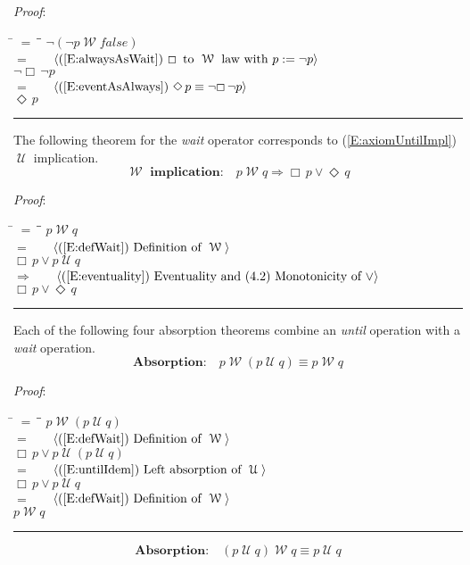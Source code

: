 \documentclass[12pt, fleqn, leqno]{article}
\newcommand{\lgap}{2pt}                             %
\newcommand{\mymathindent}{24pt}                    %
\newcommand{\impl}{\ensuremath{\Rightarrow}}        %
\newcommand{\Until}{\;\mathcal{U}\;}
\newcommand{\Wait}{\;\mathcal{W}\;}
\newcommand{\Event}{\Diamond\,}
\newcommand{\Always}{\Box\,}
\newcommand{\myqed}{\rule[-.23ex]{1.2ex}{2.0ex}}
\newcommand{\myqedtab}{\hspace{384pt}}              %
\newcommand{\Gll} {\langle}                         %
\newcommand{\Ggg} {\rangle}                         %
\newcommand{\Hint}[1]     {\ \ \ $\Gll              \mbox{#1} \Ggg$ }   %
\begin{document}
\emph{Proof}:
\begin{tabbing}
\hspace{\mymathindent} \= $= \;$ \= \myqedtab \= \kill
\> \> $\neg(\neg p \Wait false)$\\[\lgap]
\> $=$ \> \Hint{(\ref{E:alwaysAsWait}) $\Always$ to $\Wait$ law with $p := \neg p$} \\[\lgap]
\> \> $\neg\Always\neg p$\\[\lgap]
\> $=$  \>  \Hint{(\ref{E:eventAsAlways}) $\Event p \equiv \neg\Always\neg p$}\\[\lgap]
\> \> $\Event p$ \quad \myqed
\end{tabbing}

The following theorem for the \textit{wait} operator corresponds to (\ref{E:axiomUntilImpl}) $\Until$ implication.
\begin{equation}\label{E:waitEntailment}
\textbf{$\Wait$ implication:}\quad p \Wait q \impl \Always p\lor \Event q
\end{equation}

\emph{Proof}:
\begin{tabbing}
\hspace{\mymathindent} \= $= \;$ \= \myqedtab \= \kill
\> \> $p \Wait q$\\[\lgap]
\> $=$ \> \Hint{(\ref{E:defWait}) Definition of $\Wait$} \\[\lgap]
\> \> $\Always p\lor p \Until q$\\[\lgap]
\> $\impl$ \> \Hint{(\ref{E:eventuality}) Eventuality and (4.2) Monotonicity of $\lor$} \\[\lgap]
\> \> $\Always p\lor \Event q$ \quad \myqed
\end{tabbing}

Each of the following four absorption theorems combine an \textit{until} operation with a \textit{wait} operation.
\begin{equation}\label{E:leftWaitAbsUtil}
\textbf{Absorption:}\quad p \Wait (p \Until q) \equiv p \Wait q
\end{equation}

\emph{Proof}:
\begin{tabbing}
\hspace{\mymathindent} \= $= \;$ \= \myqedtab \= \kill
\> \> $p \Wait (p \Until q)$\\[\lgap]
\> $=$ \> \Hint{(\ref{E:defWait}) Definition of $\Wait$} \\[\lgap]
\> \> $\Always p\lor p \Until (p \Until q)$\\[\lgap]
\> $=$ \> \Hint{(\ref{E:untilIdem}) Left absorption of $\Until$} \\[\lgap]
\> \> $\Always p\lor p \Until q$\\[\lgap]
\> $=$ \> \Hint{(\ref{E:defWait}) Definition of $\Wait$} \\[\lgap]
\> \> $p \Wait q$ \quad \myqed
\end{tabbing}
\begin{equation}\label{E:rightWaitAbsUtil}
\textbf{Absorption:}\quad (p \Until q) \Wait q \equiv p \Until q
\end{equation}
\end{document}
